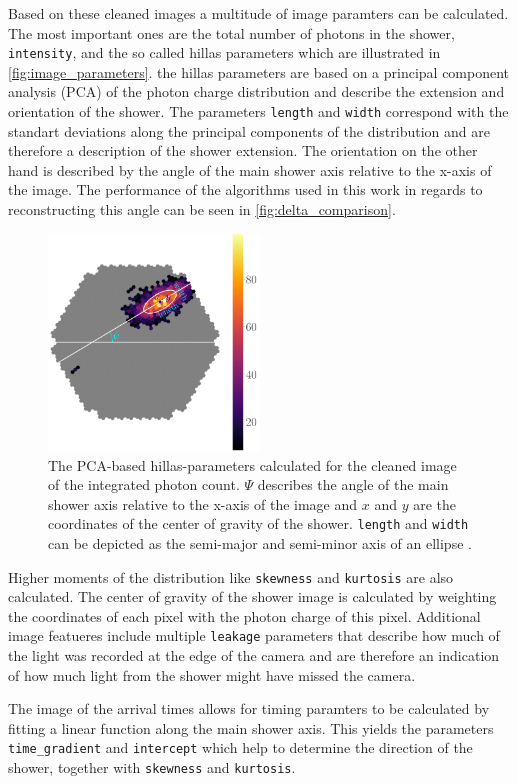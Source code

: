 Based on these cleaned images a multitude of image paramters can be calculated.
The most important ones are the total number of photons in the shower, \texttt{intensity}, and the so called hillas parameters which are illustrated in \autoref{fig:image_parameters}.
the hillas parameters are based on a principal component analysis (PCA) of the photon charge distribution and describe the extension and orientation of the shower.
The parameters \texttt{length} and \texttt{width} correspond with the standart deviations along the principal components of the distribution and are therefore a 
description of the shower extension. 
The orientation on the other hand is described by the angle of the main shower axis relative to the x-axis of the image.
The performance of the algorithms used in this work in regards to reconstructing this angle can be seen in \autoref{fig:delta_comparison}.
\begin{figure}
    \centering
    \includegraphics[width=0.5\textwidth]{images/image_parameters.png}
    \caption{The PCA-based hillas-parameters calculated for the cleaned image of the integrated photon count.
        $\Psi$ describes the angle of the main shower axis relative to the x-axis of the image and $x$ and $y$ are the coordinates of the center of gravity of the shower. 
        \texttt{length} and \texttt{width} can be depicted as the semi-major and semi-minor axis of an ellipse \cite{lukas}.
    }
    \label{fig:image_parameters}
\end{figure}

Higher moments of the distribution like \texttt{skewness} and \texttt{kurtosis} are also calculated. 
The center of gravity of the shower image is calculated by weighting the coordinates of each pixel with the photon charge of this pixel.
Additional image featueres include multiple \texttt{leakage} parameters that describe how much of the light was recorded at the edge of the camera and are
therefore an indication of how much light from the shower might have missed the camera.

The image of the arrival times allows for timing paramters to be calculated by fitting a linear function along the main shower axis. 
This yields the parameters \texttt{time\_gradient} and \texttt{intercept} which help to determine the direction of the shower, together with \texttt{skewness} and \texttt{kurtosis}.
